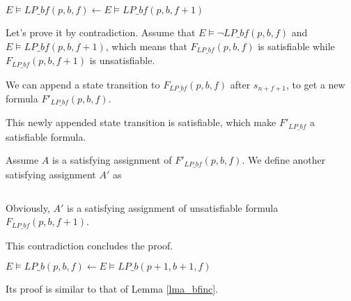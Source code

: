 \documentclass[journal]{IEEEtran}
\begin{document}
\begin{lemma}\label{lma_bfinc}
$E\vDash LP\_bf(p,b,f)\gets E\vDash LP\_bf(p,b,f+1)$
\end{lemma}
\begin{IEEEproof}
Let's prove it by contradiction.
Assume that $E\vDash\neg LP\_bf(p,b,f)$ and $E\vDash LP\_bf(p,b,f+1)$,
which means that $F_{LP\_bf}(p,b,f)$ is satisfiable while $F_{LP\_bf}(p,b,f+1)$ is unsatisfiable.

We can append a state transition to $F_{LP\_bf}(p,b,f)$ after $s_{n+f+1}$,
to get a new formula $F'_{LP\_bf}(p,b,f)$.
\begin{equation}
\end{equation}

This newly appended state transition is satisfiable,
which make $F'_{LP\_bf}$ a satisfiable formula.

Assume $A$ is a satisfying assignment of $F'_{LP\_bf}(p,b,f)$.
We define another satisfying assignment $A'$ as

\begin{equation}
\end{equation}

Obviously,
$A'$ is a satisfying assignment of unsatisfiable formula $F_{LP\_bf}(p,b,f+1)$.

This contradiction concludes the proof.
\end{IEEEproof}

\begin{lemma}\label{lma_binc}
$E\vDash LP\_b(p,b,f)\gets E\vDash LP\_b(p+1,b+1,f)$
\end{lemma}

Its proof is similar to that of Lemma \ref{lma_bfinc}.
\end{document}
